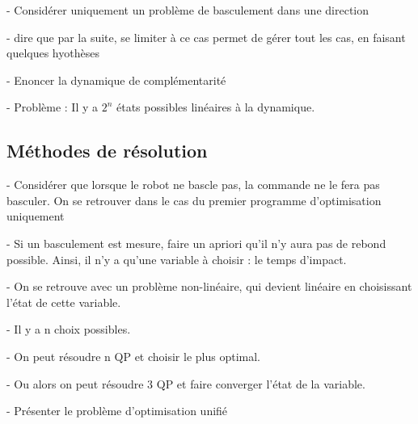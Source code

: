 			- Considérer uniquement un problème de basculement dans une direction

			- dire que par la suite, se limiter à ce cas permet de gérer tout les cas, en faisant quelques hyothèses

			- Enoncer la dynamique de complémentarité

			- Problème : Il y a $2^n$ états possibles linéaires à la dynamique.

		\subsection{Méthodes de résolution}
				- Considérer que lorsque le robot ne bascle pas, la commande ne le fera pas basculer. On se retrouver dans le cas du premier programme d'optimisation uniquement

				- Si un basculement est mesure, faire un apriori qu'il n'y aura pas de rebond possible. Ainsi, il n'y a qu'une variable à choisir : le temps d'impact.

				- On se retrouve avec un problème non-linéaire, qui devient linéaire en choisissant l'état de cette variable.

				- Il y a n choix possibles.

				- On peut résoudre n QP et choisir le plus optimal.

				- Ou alors on peut résoudre 3 QP et faire converger l'état de la variable.

				- Présenter le problème d'optimisation unifié